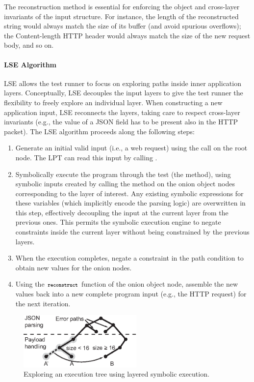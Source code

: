 The reconstruction method is essential for enforcing the object and cross-layer invariants of the input structure.  For instance, the length of the reconstructed string would always match the size of its buffer (and avoid spurious overflows); the Content-length HTTP header would always match the size of the new request body, and so on.

\paragraph{LSE Algorithm}

LSE allows the test runner to focus on exploring paths inside inner application layers. Conceptually, LSE decouples the input layers to give the test runner the flexibility to freely explore an individual layer. When constructing a new application input, LSE reconnects the layers, taking care to respect cross-layer invariants (e.g., the value of a JSON field has to be present also in the HTTP packet).
%
The LSE algorithm proceeds along the following steps:
\begin{enumerate}
\item Generate an initial valid input (i.e., a web request) using the
   call on the root node.  The LPT can read this
  input by calling .
%
\item Symbolically execute the program through the test (the
   method), using symbolic inputs created by calling
  the  method on the onion object nodes
  corresponding to the layer of interest.  
%
  Any existing symbolic expressions for these variables (which
  implicitly encode the parsing logic) are overwritten in this step,
  effectively decoupling the input at the current layer from the
  previous ones.  This permits the symbolic execution engine to negate
  constraints inside the current layer without being constrained
  by the previous layers.
%
\item When the execution completes, negate a constraint in the path
  condition to obtain new values for the onion nodes.
%
\item Using the $\texttt{\footnotesize \bfseries reconstruct}$ function of the onion object
  node, assemble the new values back into a new complete program input
  (e.g., the HTTP request) for the next iteration.
\end{enumerate}

\begin{figure}
  \centering
  \includegraphics[width=2.4in]{paas/figures/layered-tree}
  \caption{Exploring an execution tree using layered symbolic
    execution.}
  \label{fig:layered-tree}
\end{figure}

